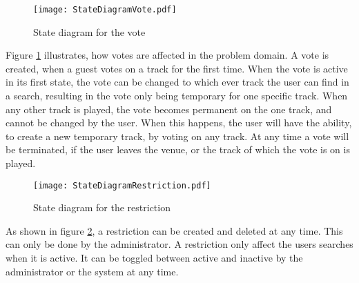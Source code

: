 \begin{figure}[H]
  \centering
  \texttt{[image: StateDiagramVote.pdf]}
  \caption{State diagram for the vote}\label{fig:StateDiagramVote}
\end{figure}
Figure \cref{fig:StateDiagramVote} illustrates, how votes are affected in the problem domain. A vote is created, when a guest votes on a track for the first time. When the vote is active in its first state, the vote can be changed to which ever track the user can find in a search, resulting in the vote only being temporary for one specific track. When any other track is played, the vote becomes permanent on the one track, and cannot be changed by the user. When this happens, the user will have the ability, to create a new temporary track, by voting on any track. At any time a vote will be terminated, if the user leaves the venue, or the track of which the vote is on is played.

\begin{figure}[H]
  \centering
  \texttt{[image: StateDiagramRestriction.pdf]}
  \caption{State diagram for the restriction}\label{fig:StateDiagramRestriction}
\end{figure}
As shown in figure \cref{fig:StateDiagramRestriction}, a restriction can be created and deleted at any time. This can only be done by the administrator. A restriction only affect the users searches when it is active. It can be toggled between active and inactive by the administrator or the system at any time.